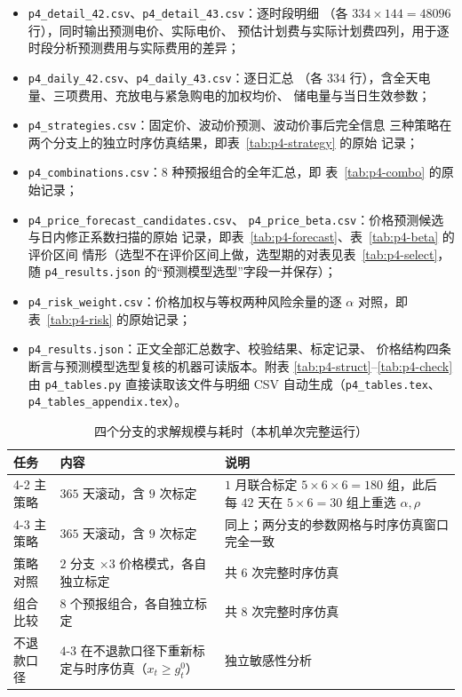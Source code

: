 \documentclass[withoutpreface,bwprint]{cumcmthesis}
\begin{document}
\begin{appendices}
\begin{itemize}
  \item \texttt{p4\_detail\_42.csv}、\texttt{p4\_detail\_43.csv}：逐时段明细
        （各 $334\times144=48096$ 行），同时输出预测电价、实际电价、
        预估计划费与实际计划费四列，用于逐时段分析预测费用与实际费用的差异；
  \item \texttt{p4\_daily\_42.csv}、\texttt{p4\_daily\_43.csv}：逐日汇总
        （各 $334$ 行），含全天电量、三项费用、充放电与紧急购电的加权均价、
        储电量与当日生效参数；
  \item \texttt{p4\_strategies.csv}：固定价、波动价预测、波动价事后完全信息
        三种策略在两个分支上的独立时序仿真结果，即表~\ref{tab:p4-strategy} 的原始
        记录；
  \item \texttt{p4\_combinations.csv}：$8$ 种预报组合的全年汇总，即
        表~\ref{tab:p4-combo} 的原始记录；
  \item \texttt{p4\_price\_forecast\_candidates.csv}、
        \texttt{p4\_price\_beta.csv}：价格预测候选与日内修正系数扫描的原始
        记录，即表~\ref{tab:p4-forecast}、表~\ref{tab:p4-beta} 的评价区间
        情形（选型不在评价区间上做，选型期的对表见表~\ref{tab:p4-select}，
        随 \texttt{p4\_results.json} 的``预测模型选型''字段一并保存）；
  \item \texttt{p4\_risk\_weight.csv}：价格加权与等权两种风险余量的逐 $\alpha$
        对照，即表~\ref{tab:p4-risk} 的原始记录；
  \item \texttt{p4\_results.json}：正文全部汇总数字、校验结果、标定记录、
        价格结构四条断言与预测模型选型复核的机器可读版本。附表
        \ref{tab:p4-struct}--\ref{tab:p4-check} 由 \texttt{p4\_tables.py}
        直接读取该文件与明细 CSV 自动生成（\texttt{p4\_tables.tex}、
        \texttt{p4\_tables\_appendix.tex}）。
\end{itemize}

\begin{table}[htbp]
  \centering
  \caption{四个分支的求解规模与耗时（本机单次完整运行）}
  \label{tab:p4-cost}
  \small
  \begin{tabularx}{\textwidth}{@{}lXX@{}}
    \toprule
    任务 & 内容 & 说明 \\
    \midrule
    4-2 主策略 & $365$ 天滚动，含 $9$ 次标定 & $1$ 月联合标定 $5\times6\times6=180$ 组，此后每 $42$ 天在 $5\times6=30$ 组上重选 $\alpha,\rho$ \\
    4-3 主策略 & $365$ 天滚动，含 $9$ 次标定 & 同上；两分支的参数网格与时序仿真窗口完全一致 \\
    策略对照 & $2$ 分支 $\times3$ 价格模式，各自独立标定 & 共 $6$ 次完整时序仿真 \\
    组合比较 & $8$ 个预报组合，各自独立标定 & 共 $8$ 次完整时序仿真 \\
    不退款口径 & $4$-3 在不退款口径下重新标定与时序仿真（$x_t\ge g_t^0$） & 独立敏感性分析 \\
    \bottomrule
  \end{tabularx}
\end{table}


\end{appendices}
\end{document}
